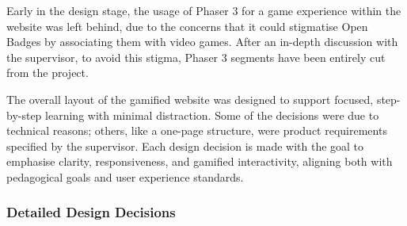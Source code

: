 Early in the design stage, the usage of Phaser 3 for a game experience within the website was left behind, due to the concerns that it could stigmatise Open Badges by associating them with video games. 
After an in-depth discussion with the supervisor, to avoid this stigma, Phaser 3 segments have been entirely cut from the project.

The overall layout of the gamified website was designed to support focused, step-by-step learning with minimal distraction. 
Some of the decisions were due to technical reasons; others, like a one-page structure, were product requirements specified by the supervisor.
Each design decision is made with the goal to emphasise clarity, responsiveness, and gamified interactivity, aligning both with pedagogical goals and user experience standards.

\subsubsection{Detailed Design Decisions}

